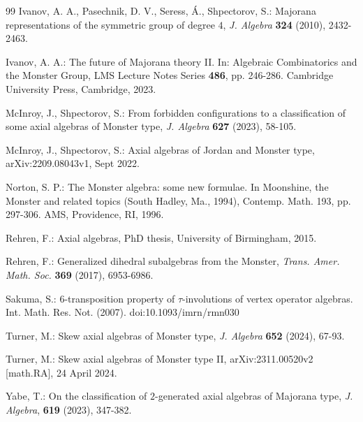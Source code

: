 \documentclass[a4paper]{amsart}
\begin{document}
\begin{thebibliography}{99}
  Ivanov,  A. A., Pasechnik, D. V., Seress, \'A., Shpectorov, S.: Majorana representations of the symmetric group of degree $4$,  {\it J. Algebra} {\bf  324} (2010), 2432-2463. 
 
  Ivanov,  A. A.: The future of Majorana theory II. In: Algebraic Combinatorics and the Monster Group, LMS Lecture Notes Series {\bf 486}, pp. 246-286. Cambridge University Press, Cambridge, 2023.

 McInroy, J., Shpectorov, S.: From forbidden configurations to a classification of some axial algebras of Monster type, {\it J. Algebra} {\bf 627} (2023), 58-105.

 McInroy, J., Shpectorov, S.: Axial algebras of Jordan and Monster type, arXiv:2209.08043v1, Sept 2022.

 Norton, S. P.: The Monster algebra: some new formulae. In Moonshine, the Monster and related topics (South Hadley, Ma., 1994), Contemp. Math. 193, pp. 297-306. AMS, Providence, RI, 1996.

 Rehren, F.: Axial algebras, PhD thesis, University of Birmingham, 2015.

 Rehren, F.: Generalized dihedral subalgebras from the Monster, {\it Trans. Amer. Math. Soc.} {\bf 369} (2017), 6953-6986.

 Sakuma, S.: $6$-transposition property of $\tau$-involutions of vertex operator algebras. Int. Math. Res. Not. (2007). doi:10.1093/imrn/rmn030

 Turner, M.: Skew axial algebras of Monster type, {\it J. Algebra} {\bf 652} (2024), 67-93.

 Turner, M.: Skew axial algebras of Monster type II, arXiv:2311.00520v2 [math.RA], 24 April 2024.

 Yabe, T.: On the classification of $2$-generated axial algebras of Majorana type, {\it J. Algebra}, {\bf 619} (2023), 347-382.


\end{thebibliography}
\end{document}
